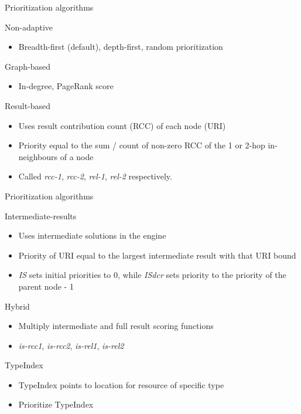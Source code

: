 
\begin{frame}{Prioritization algorithms \parencite{hartig2016walking}}
  \begin{block}{Non-adaptive}
    \begin{itemize}
        \item Breadth-first (default), depth-first, random prioritization
    \end{itemize}
  \end{block}
  \begin{block}{Graph-based}
        \begin{itemize}
        \item In-degree, PageRank score
    \end{itemize}
  \end{block}
  \begin{block}{Result-based}
        \begin{itemize}
        \item Uses result contribution count (RCC) of each node (URI)
        \item Priority equal to the sum / count of non-zero RCC of the 1 or 2-hop in-neighbours of a node
        \item Called \emph{rcc-1}, \emph{rcc-2}, \emph{rel-1}, \emph{rel-2} respectively. 
    \end{itemize}
  \end{block}
\end{frame}

\begin{frame}{Prioritization algorithms}
  \begin{block}{Intermediate-results}
        \begin{itemize}
        \item Uses intermediate solutions in the engine
        \item Priority of URI equal to the largest intermediate result with that URI bound
        \item \emph{IS} sets initial priorities to 0, while \emph{ISdcr} sets priority to the priority of the parent node - 1
    \end{itemize}
  \end{block}
  \begin{block}{Hybrid}
        \begin{itemize}
        \item Multiply intermediate and full result scoring functions
        \item \emph{is-rcc1}, \emph{is-rcc2}, \emph{is-rel1}, \emph{is-rel2} 
    \end{itemize}
  \end{block}
  \begin{block}{TypeIndex}
        \begin{itemize}
        \item TypeIndex points to location for resource of specific type
        \item Prioritize TypeIndex
    \end{itemize}
  \end{block}
\end{frame}

